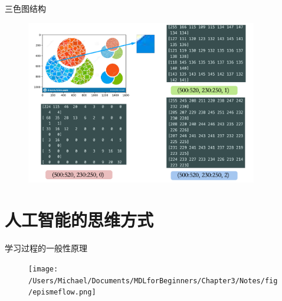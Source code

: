 \documentclass[handout]{beamer}
\begin{document}
\begin{frame}{三色图结构}
\begin{figure}[H]
	\centering
	\includegraphics[width=0.9\textwidth]{fig/rgbdecomposition}
\end{figure}
\end{frame}


\section{人工智能的思维方式}

\begin{frame}{学习过程的一般性原理}
	\begin{figure}[H]
		\centering
		\texttt{[image: /Users/Michael/Documents/MDLforBeginners/Chapter3/Notes/fig/epismeflow.png]}
	\end{figure}
\end{frame}
\end{document}
